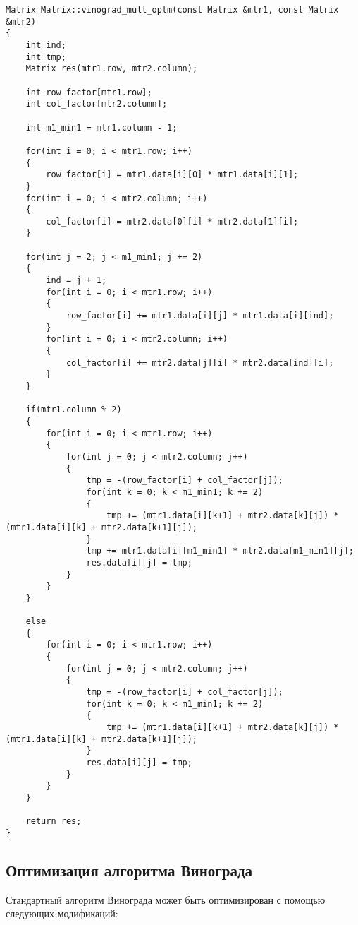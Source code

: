 \documentclass[a4paper, 14pt]{article}
\begin{document}
	\newpage
	\begin{lstlisting}[label=some-code,caption=Оптимизированный алгоритм Винограда]
Matrix Matrix::vinograd_mult_optm(const Matrix &mtr1, const Matrix &mtr2)
{
    int ind;
    int tmp;
    Matrix res(mtr1.row, mtr2.column);

    int row_factor[mtr1.row];
    int col_factor[mtr2.column];

    int m1_min1 = mtr1.column - 1;

    for(int i = 0; i < mtr1.row; i++)
    {
        row_factor[i] = mtr1.data[i][0] * mtr1.data[i][1];
    }
    for(int i = 0; i < mtr2.column; i++)
    {
        col_factor[i] = mtr2.data[0][i] * mtr2.data[1][i];
    }

    for(int j = 2; j < m1_min1; j += 2)
    {
        ind = j + 1;
        for(int i = 0; i < mtr1.row; i++)
        {
            row_factor[i] += mtr1.data[i][j] * mtr1.data[i][ind];
        }
        for(int i = 0; i < mtr2.column; i++)
        {
            col_factor[i] += mtr2.data[j][i] * mtr2.data[ind][i];
        }
    }
    
    if(mtr1.column % 2)
    {
        for(int i = 0; i < mtr1.row; i++)
        {
            for(int j = 0; j < mtr2.column; j++)
            {
                tmp = -(row_factor[i] + col_factor[j]);
                for(int k = 0; k < m1_min1; k += 2)
                {
                    tmp += (mtr1.data[i][k+1] + mtr2.data[k][j]) * (mtr1.data[i][k] + mtr2.data[k+1][j]);
                }
                tmp += mtr1.data[i][m1_min1] * mtr2.data[m1_min1][j];
                res.data[i][j] = tmp;
            }
        }
    }
    
    else
    {
        for(int i = 0; i < mtr1.row; i++)
        {
            for(int j = 0; j < mtr2.column; j++)
            {
                tmp = -(row_factor[i] + col_factor[j]);
                for(int k = 0; k < m1_min1; k += 2)
                {
                    tmp += (mtr1.data[i][k+1] + mtr2.data[k][j]) * (mtr1.data[i][k] + mtr2.data[k+1][j]);
                }
                res.data[i][j] = tmp;
            }
        }
    }

    return res;
}
\end{lstlisting}

	\subsection{Оптимизация алгоритма Винограда}
	
		Стандартный алгоритм Винограда может быть оптимизирован с помощью следующих модификаций:
	
\end{document}
